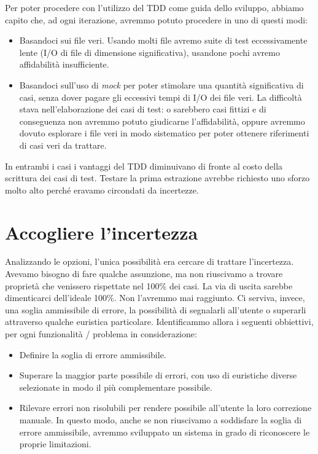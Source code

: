 \documentclass[12pt]{report}
\begin{document}
Per poter procedere con l'utilizzo del TDD come guida dello sviluppo,
abbiamo capito che, ad ogni iterazione, avremmo potuto
procedere in uno di questi modi:

\begin{itemize}
  \item Basandoci sui file veri. Usando molti file avremo suite di test
  eccessivamente lente (I/O di file di dimensione significativa),
  usandone pochi avremo affidabilità insufficiente. 
  \item Basandoci sull'uso di \textit{mock} 
  per poter stimolare una quantità significativa di casi, 
  senza dover pagare gli eccessivi tempi di I/O dei file veri. 
  La difficoltà stava nell'elaborazione dei casi di test: o 
  sarebbero casi fittizi e di conseguenza non avremmo potuto giudicarne 
  l'affidabilità, oppure avremmo dovuto esplorare i file veri in modo
  sistematico per poter ottenere riferimenti di casi veri da trattare.
\end{itemize}

In entrambi i casi i vantaggi del TDD diminuivano di fronte al costo della
scrittura dei casi di test. Testare la prima estrazione
avrebbe richiesto uno sforzo molto alto perché eravamo
circondati da incertezze.

\section{Accogliere l'incertezza}

Analizzando le opzioni, l'unica possibilità era cercare di
trattare l'incertezza. Avevamo bisogno di fare qualche assunzione, ma
non riuscivamo a trovare proprietà che venissero rispettate nel 100\%
dei casi. La via di uscita sarebbe dimenticarci dell'ideale 100\%.
Non l'avremmo mai raggiunto. Ci serviva, invece, una soglia ammissibile di
errore, la possibilità di segnalarli all'utente o superarli attraverso qualche
euristica particolare. Identificammo allora i seguenti obbiettivi, per ogni
funzionalità / problema in considerazione: 

\begin{itemize}
  \item Definire la soglia di errore ammissibile.
  \item Superare la maggior parte possibile di errori, con uso di
euristiche diverse selezionate in modo il più complementare possibile.
  \item Rilevare errori non risolubili per rendere possibile
all'utente la loro correzione manuale. In questo modo, anche se non
riuscivamo a soddisfare la soglia di errore ammissibile, avremmo
sviluppato un sistema in grado di riconoscere le proprie limitazioni.
\end{itemize}
\end{document}
